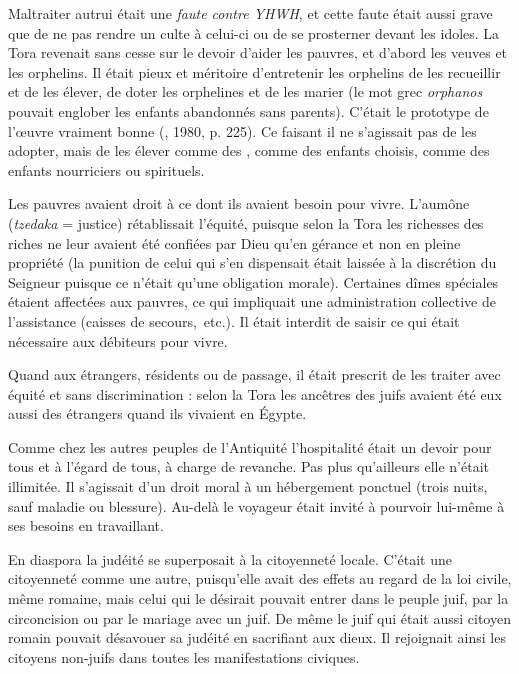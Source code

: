 Maltraiter autrui était une \emph{faute contre YHWH}, et cette faute était aussi grave que de ne pas rendre un culte à celui-ci ou de se prosterner devant les idoles. La Tora revenait sans cesse sur le devoir d'aider les pauvres, et d'abord les veuves et les orphelins. Il était pieux et méritoire d'entretenir les orphelins de les recueillir et de les élever, de doter les orphelines et de les marier (le mot grec \emph{orphanos} pouvait englober les enfants abandonnés sans parents). C'était le prototype de l'œuvre vraiment bonne (, 1980, p. 225). Ce faisant il ne s'agissait pas de les adopter, mais de les élever comme des , comme des enfants choisis, comme des enfants nourriciers ou spirituels. 

 Les pauvres avaient droit à ce dont ils avaient besoin pour vivre. L'aumône (\emph{tzedaka} = justice) rétablissait l'équité, puisque selon la Tora les richesses des riches ne leur avaient été confiées par Dieu qu'en gérance et non en pleine propriété (la punition de celui qui s'en dispensait était laissée à la discrétion du Seigneur puisque ce n'était qu'une obligation morale). Certaines dîmes spéciales étaient affectées aux pauvres, ce qui impliquait une administration collective de l'assistance (caisses de secours,~etc.). Il était interdit de saisir ce qui était nécessaire aux débiteurs pour vivre. 

 Quand aux étrangers, résidents ou de passage, il était prescrit de les traiter avec équité et sans discrimination : selon la Tora les ancêtres des juifs avaient été eux aussi des étrangers quand ils vivaient en Égypte. 

 Comme chez les autres peuples de l'Antiquité l'hospitalité était un devoir pour tous et à l'égard de tous, à charge de revanche. Pas plus qu'ailleurs elle n'était illimitée. Il s'agissait d'un droit moral à un hébergement ponctuel (trois nuits, sauf maladie ou blessure). Au-delà le voyageur était invité à pourvoir lui-même à ses besoins en travaillant. 

 En diaspora la judéité se superposait à la citoyenneté locale. C'était une citoyenneté comme une autre, puisqu'elle avait des effets au regard de la loi civile, même romaine, mais celui qui le désirait pouvait entrer dans le peuple juif, par la circoncision ou par le mariage avec un juif. De même le juif qui était aussi citoyen romain pouvait désavouer sa judéité en sacrifiant aux dieux. Il rejoignait ainsi les citoyens non-juifs dans toutes les manifestations civiques.
 
